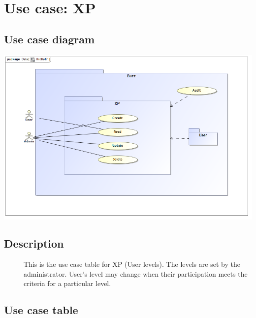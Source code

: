 \documentclass{article}
\begin{document}
\section{Use case: XP}
	\subsection{Use case diagram}
\includegraphics[width=\textwidth]{XP.png}
	\subsection{Description}
	\begin{description}
		\item[] This is the use case table for XP (User levels). The levels are set by the administrator. User's level may change when their participation meets the criteria for a particular level.  
	\end{description}
	\subsection{Use case table}
\end{document}
